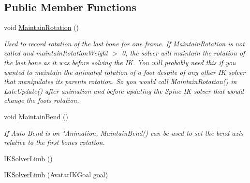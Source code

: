\subsection*{Public Member Functions}
\begin{DoxyCompactItemize}
\item 
void \mbox{\hyperlink{class_root_motion_1_1_final_i_k_1_1_i_k_solver_limb_ab95ef3cadd6e98bfe72008751dbda1bd}{Maintain\+Rotation}} ()
\begin{DoxyCompactList}\small\item\em Used to record rotation of the last bone for one frame. If Maintain\+Rotation is not called and maintain\+Rotation\+Weight $>$ 0, the solver will maintain the rotation of the last bone as it was before solving the IK. You will probably need this if you wanted to maintain the animated rotation of a foot despite of any other IK solver that manipulates it\textquotesingle{}s parents\textquotesingle{} rotation. So you would call Maintain\+Rotation() in Late\+Update() after animation and before updating the Spine IK solver that would change the foot\textquotesingle{}s rotation. \end{DoxyCompactList}\item 
void \mbox{\hyperlink{class_root_motion_1_1_final_i_k_1_1_i_k_solver_limb_a82c2e3eba2fdc5e791f0486196eaedeb}{Maintain\+Bend}} ()
\begin{DoxyCompactList}\small\item\em If Auto Bend is on "Animation\textquotesingle{}, Maintain\+Bend() can be used to set the bend axis relative to the first bone\textquotesingle{}s rotation. \end{DoxyCompactList}\item 
\mbox{\hyperlink{class_root_motion_1_1_final_i_k_1_1_i_k_solver_limb_a664bd717bbf86ffcd70562f87930f742}{I\+K\+Solver\+Limb}} ()
\item 
\mbox{\hyperlink{class_root_motion_1_1_final_i_k_1_1_i_k_solver_limb_af5ae62fda59273d4861eb5213a4bd021}{I\+K\+Solver\+Limb}} (Avatar\+I\+K\+Goal \mbox{\hyperlink{class_root_motion_1_1_final_i_k_1_1_i_k_solver_limb_af4266fb62c9f171f7e7c68a7bdbcdc44}{goal}})
\end{DoxyCompactItemize}
